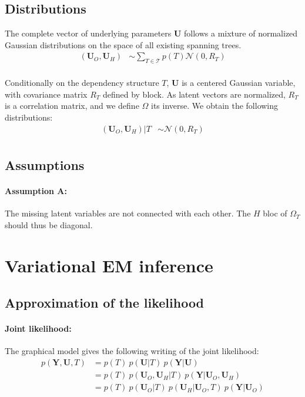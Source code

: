 \documentclass[11pt,a4paper]{article}
\newcommand{\Ybf}{\boldsymbol{Y}}
\newcommand{\Ubf}{\boldsymbol{U}}
\begin{document}
\subsection{Distributions}
\label{distrib}
 
The complete vector of underlying parameters $\Ubf$ follows a mixture of normalized Gaussian distributions on the space of all existing spanning trees.
\begin{align*}
(\Ubf_O,\Ubf_H) &\sim \sum_{T \in \mathcal{T}} p(T) \mathcal{N}(0,R_T) \\
\end{align*}

 
Conditionally on the dependency structure $T$, $\Ubf$ is a centered Gaussian variable, with covariance matrix $R_T$ defined by block. As latent vectors are normalized, $R_T$ is a correlation matrix, and we define $\Omega$ its inverse. We obtain the following distributions:
\begin{align*}
(\Ubf_O,\Ubf_H)|T & \sim\mathcal{N}(0,R_T)\\
\end{align*}
 
 

\subsection{Assumptions}
\paragraph{Assumption A:} The missing latent variables are not connected with each other. The $H$ bloc of $\Omega_T$ should thus be diagonal.
 
 
 \section{Variational EM inference}
\subsection{Approximation of the likelihood}
\paragraph{Joint likelihood:}
The graphical model gives the following writing of the joint likelihood:
\begin{align*}
p(\Ybf,\Ubf,T)& = p(T) \: p(\Ubf|T) \: p(\Ybf|\Ubf) \\
&= p(T)\: p(\Ubf_O,\Ubf_H|T) \: p(\Ybf|\Ubf_O,\Ubf_H) \\
&= p(T) \: p(\Ubf_O|T) \: p(\Ubf_H | \Ubf_O,T)  \: p(\Ybf|\Ubf_O)
\end{align*} 
\end{document}
